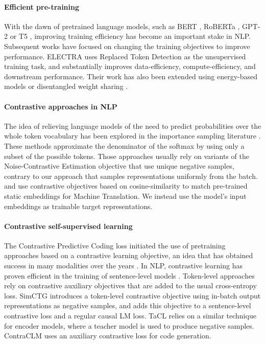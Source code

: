 \paragraph{Efficient pre-training}
With the dawn of pretrained language models, such as BERT \citep{devlin-etal-2019-bert}, RoBERTa \citep{roberta}, GPT-2 \citep{gpt2} or T5 \citep{2020t5}, improving training efficiency has become an important stake in NLP. 
%
Subsequent works have focused on changing the training objectives to improve performance. ELECTRA \citep{electra} uses Replaced Token Detection as the unsupervised training task, and substantially improves data-efficiency, compute-efficiency, and downstream performance. Their work has also been extended using energy-based models \citep{clark-etal-2020-pre} or disentangled weight sharing \citep{deberta}.

\paragraph{Contrastive approaches in NLP}
The idea of relieving language models of the need to predict probabilities over the whole token vocabulary has been explored in the importance sampling literature \citep{quick_train_bengio_03,mnih2012fast,jean-etal-2015-using, ma-collins-2018-noise}. These methods approximate the denominator of the softmax by using only a subset of the possible tokens. Those approaches usually rely on variants of the Noise-Contrastive Estimation objective \citep{nce} that use unique negative samples, contrary to our approach that samples representations uniformly from the batch. \citet{kumar2018vmf} and \citet{tokarchuk-niculae-2022-target} use contrastive objectives based on cosine-similarity to match pre-trained static embeddings for Machine Translation. 
% 
We instead use the model's input embeddings as trainable target representations.

\paragraph{Contrastive self-supervised learning}
The Contrastive Predictive Coding loss \citep{oord2019representation} initiated the use of pretraining approaches based on a contrastive learning objective, an idea that has obtained success in many modalities over the years \citep{sermanet2018timecontrastive,schneider19_interspeech, wav2vec2,algayres-etal-2022-dp}. 
%
In NLP, contrastive learning has proven efficient in the training of sentence-level models \citep{gao-etal-2021-simcse, yan-etal-2021-consert, klein-nabi-2023-micse}. Token-level approaches rely on contrastive auxiliary objectives that are added to the usual cross-entropy loss. SimCTG \citep{su2022contrastive} introduces a token-level contrastive objective using in-batch output representations as negative samples, and adds this objective to a sentence-level contrastive loss and a regular causal LM loss. TaCL \citep{su-etal-2022-tacl} relies on a similar technique for encoder models, where a teacher model is used to produce negative samples. ContraCLM \citep{jain-etal-2023-contraclm} uses an auxiliary contrastive loss for code generation.

